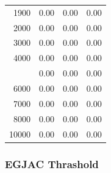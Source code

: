 \documentclass[12pt]{article}
\begin{document}
\begin{minipage}{0.5\textwidth}
\begin{tabular}{rccc}
   1900 & 0.00 & 0.00 & 0.00 \\ 
   2000 & 0.00 & 0.00 & 0.00 \\ 
   3000 & 0.00 & 0.00 & 0.00 \\ 
   4000 & 0.00 & 0.00 & 0.00 \\  \addlinespace
   5000 & 0.00 & 0.00 & 0.00 \\ 
   6000 & 0.00 & 0.00 & 0.00 \\ 
   7000 & 0.00 & 0.00 & 0.00 \\ 
   8000 & 0.00 & 0.00 & 0.00 \\ 
  10000 & 0.00 & 0.00 & 0.00 \\ 
\bottomrule
\end{tabular}

\end{minipage}





\subsubsection*{EGJAC Thrashold}
\end{document}
